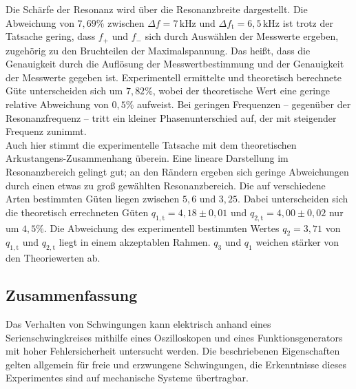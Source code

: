 Die Schärfe der Resonanz wird über die Resonanzbreite dargestellt. 
Die Abweichung von $7,69\%$ zwischen $\Delta{f}=7\,\si{\kilo\hertz}$ und $\Delta{f_\mathup{t}}=6,5\,\si{\kilo\hertz}$ 
ist  trotz der Tatsache gering, dass $f_+$ und $f_-$ sich durch Auswählen der Messwerte ergeben, zugehörig zu den Bruchteilen der Maximalspannung. 
Das heißt, dass die Genauigkeit durch die Auflösung der Messwertbestimmung und der Genauigkeit der Messwerte gegeben ist. Experimentell ermittelte und theoretisch berechnete Güte unterscheiden sich um $7,82\%$, wobei der theoretische Wert eine geringe relative Abweichung von $0,5\%$ aufweist.
Bei geringen Frequenzen -- gegenüber der Resonanzfrequenz -- tritt ein kleiner Phasenunterschied auf, der mit steigender Frequenz zunimmt. \\
Auch hier stimmt die experimentelle Tatsache mit dem theoretischen Arkustangens-Zusammenhang überein. 
Eine lineare Darstellung im Resonanzbereich gelingt gut; 
an den Rändern ergeben sich geringe Abweichungen durch einen etwas zu groß gewählten Resonanzbereich.
Die auf verschiedene Arten bestimmten Güten liegen zwischen $5,6$ und $3,25$. Dabei unterscheiden sich die theoretisch errechneten Güten $q_{1,\mathup{t}}=4,18\pm0,01$ und $q_{2,\mathup{t}}=4,00\pm0,02$ nur um $4,5\%$. Die Abweichung des experimentell bestimmten Wertes $q_2=3,71$ von  $q_{1,\mathup{t}}$ und  $q_{2,\mathup{t}}$ liegt in einem akzeptablen Rahmen. $q_3$ und $q_1$ weichen stärker von den Theoriewerten ab.

\subsection{Zusammenfassung}
Das Verhalten von Schwingungen kann elektrisch anhand eines Serienschwingkreises mithilfe eines Oszilloskopen und eines Funktionsgenerators mit hoher Fehlersicherheit untersucht werden.
Die beschriebenen Eigenschaften gelten allgemein für freie und erzwungene Schwingungen, die Erkenntnisse dieses Experimentes sind auf mechanische Systeme übertragbar.
